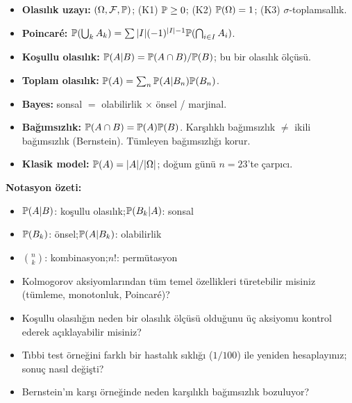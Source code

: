 \begin{bolumozeti}
\begin{itemize}
  \item \textbf{Olasılık uzayı:} $(\Omega,\mathcal{F},\mathbb{P})$; (K1) $\mathbb{P} \geq 0$;
        (K2) $\mathbb{P}(\Omega)=1$; (K3) $\sigma$-toplamsallık.
  \item \textbf{Poincaré:} $\mathbb{P}(\bigcup_k A_k) = \sum|I|(-1)^{|I|-1}\mathbb{P}(\bigcap_{i\in I}A_i)$.
  \item \textbf{Koşullu olasılık:} $\mathbb{P}(A|B) = \mathbb{P}(A \cap B)/\mathbb{P}(B)$;
        bu bir olasılık ölçüsü.
  \item \textbf{Toplam olasılık:} $\mathbb{P}(A) = \sum_n \mathbb{P}(A|B_n)\mathbb{P}(B_n)$.
  \item \textbf{Bayes:} sonsal $= $ olabilirlik $\times$ önsel / marjinal.
  \item \textbf{Bağımsızlık:} $\mathbb{P}(A \cap B) = \mathbb{P}(A)\mathbb{P}(B)$.
        Karşılıklı bağımsızlık $\neq$ ikili bağımsızlık (Bernstein).
        Tümleyen bağımsızlığı korur.
  \item \textbf{Klasik model:} $\mathbb{P}(A) = |A|/|\Omega|$;
        doğum günü $n=23$'te çarpıcı.
\end{itemize}

\medskip\noindent\textbf{Notasyon özeti:}
\begin{itemize}
  \item $\mathbb{P}(A|B)$: koşullu olasılık;\quad $\mathbb{P}(B_k|A)$: sonsal
  \item $\mathbb{P}(B_k)$: önsel;\quad $\mathbb{P}(A|B_k)$: olabilirlik
  \item $\binom{n}{k}$: kombinasyon;\quad $n!$: permütasyon
\end{itemize}
\end{bolumozeti}

\begin{ozyansima}
\begin{itemize}
  \item Kolmogorov aksiyomlarından tüm temel özellikleri türetebilir misiniz
        (tümleme, monotonluk, Poincaré)?
  \item Koşullu olasılığın neden bir olasılık ölçüsü olduğunu üç aksiyomu
        kontrol ederek açıklayabilir misiniz?
  \item Tıbbi test örneğini farklı bir hastalık sıklığı ($1/100$) ile yeniden
        hesaplayınız; sonuç nasıl değişti?
  \item Bernstein'ın karşı örneğinde neden karşılıklı bağımsızlık bozuluyor?
\end{itemize}
\end{ozyansima}

